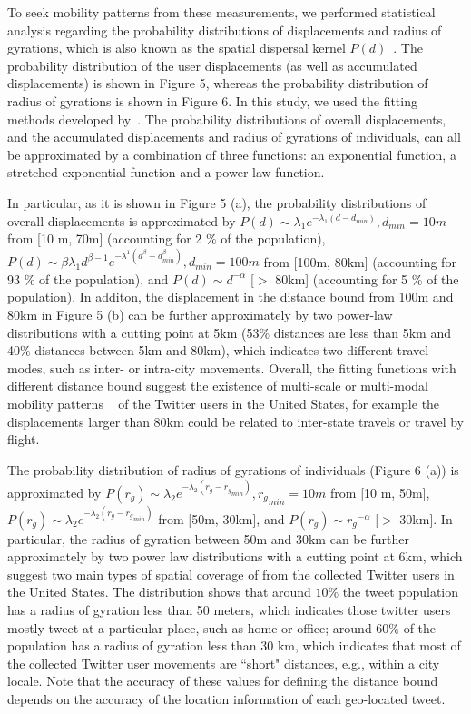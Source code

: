 \documentclass[ijgi,article,submit,moreauthors,pdftex,10pt,a4paper]{mdpi}
\theoremstyle{mdpi}
\newcounter{ex}
\newcounter{re}
\theoremstyle{mdpidefinition}
\begin{document}
To seek mobility patterns from these measurements, we performed statistical analysis regarding the probability distributions of displacements and radius of gyrations, which is also known as the spatial dispersal kernel $P(d)$~\cite{brockmann2006scaling}. The probability distribution of the user displacements (as well as accumulated displacements) is shown in Figure 5, whereas the probability distribution of radius of gyrations is shown in Figure 6. In this study, we used the fitting methods developed by~\cite{Jurdak2015}. The probability distributions of overall displacements, and the accumulated displacements and radius of gyrations of individuals, can all be approximated by a combination of three functions: an exponential function, a stretched-exponential function and a power-law function.

In particular, as it is shown in Figure 5 (a), the probability distributions of overall displacements is approximated by $P(d) \sim \lambda_{1} e^{-\lambda_{1}(d - d_{min})}, d_{min}=10m$ from [10 m, 70m] (accounting for 2 $\%$ of the population),  $ P(d) \sim \beta\lambda_{1}d^{\beta-1}e^{-\lambda^{1}(d^\beta-d_{min}^\beta)}, d_{min} = 100m$ from [100m, 80km] (accounting for 93 $\%$ of the population), and $P(d) \sim {d}^{-\alpha}$ [$>$ 80km] (accounting for 5 $\%$ of the population). In additon, the displacement in the distance bound from 100m and 80km in Figure 5 (b) can be further approximately by two power-law distributions with a cutting point at 5km (53$\%$ distances are less than 5km and 40$\%$ distances between 5km and 80km), which indicates two different travel modes, such as inter- or intra-city movements.
Overall, the fitting functions with different distance bound suggest the existence of multi-scale or multi-modal mobility patterns ~\cite{Jurdak2015} of the Twitter users in the United States, for example the displacements larger than 80km could be related to inter-state travels or travel by flight. 

The probability distribution of radius of gyrations of individuals (Figure 6 (a)) is approximated by $P(r_{g}) \sim \lambda_{2} e^{-\lambda_{2}(r_{g} - {r_{g}}_{min})}, {r_{g}}_{min}=10m$ from [10 m, 50m], $P(r_{g}) \sim \lambda_{2} e^{-\lambda_{2}(r_{g} - {r_{g}}_{min})}$ from [50m, 30km], and $P(r_{g}) \sim {r_{g}}^{-\alpha}$ [$>$ 30km]. In particular, the radius of gyration between 50m and 30km can be further approximately by two power law distributions with a cutting point at 6km, which suggest two main types of spatial coverage of from the collected Twitter users in the United States. The distribution shows that around $10\%$ the tweet population has a radius of gyration less than 50 meters, which indicates those twitter users mostly tweet at a particular place, such as home or office;  around 60$\%$ of the population has a radius of gyration less than 30 km, which indicates that most of the collected Twitter user movements are ``short" distances, e.g., within a city locale. Note that the accuracy of these values for defining the distance bound depends on the accuracy of the location information of each geo-located tweet. 
\end{document}
